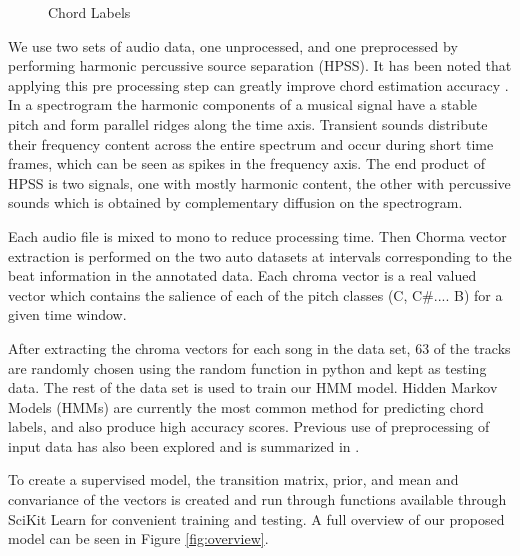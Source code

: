 \documentclass{article}
\begin{document}
\begin{figure}
\begin{center}
\caption{Chord Labels}
\label{fig:chordlabs}
\end{center}
\end{figure}

We use two sets of audio data, one unprocessed, and one preprocessed by
performing harmonic percussive source separation (HPSS). It has been noted that 
applying this pre processing step can greatly improve chord estimation accuracy \cite{Reed:09}. 
In a spectrogram the harmonic components of a musical signal have 
a stable pitch and form parallel ridges along the time axis. Transient sounds distribute 
their frequency content across the entire spectrum and occur during short time frames, 
which can be seen as spikes in the frequency axis. The end product of HPSS is two signals, 
one with mostly harmonic content, the other with percussive sounds which is obtained by 
complementary diffusion on the spectrogram.

Each audio file is mixed to mono to reduce processing time. Then Chorma vector extraction is 
performed on the two auto datasets at intervals corresponding to the beat information in the 
annotated data. Each chroma vector is a real valued vector which contains the salience of each 
of the pitch classes (C, C\#.... B) for a given time window.

After extracting the chroma vectors for each song in the data set, 63 of the tracks are randomly
chosen using the random function in python and kept as testing data. The rest of the data set
is used to train our HMM model. Hidden Markov Models (HMMs) are currently the most common method for 
predicting chord labels, and also produce high accuracy scores. Previous use of
preprocessing of input data has also been explored and is summarized in \cite{McVicar:00}.

To create a supervised model, the transition matrix, prior, and mean and convariance of the 
vectors is created and run through functions available through
SciKit Learn for convenient training and testing. A full overview of our
proposed model can be seen in Figure \ref{fig:overview}.
\end{document}
